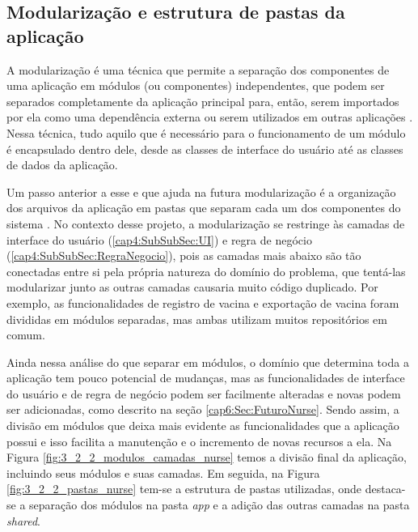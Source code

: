 
\subsection{Modularização e estrutura de pastas da aplicação}
\label{cap4:Subsec:Modularizacao}
A modularização é uma técnica que permite a separação dos componentes de uma aplicação em módulos (ou componentes) independentes, que podem ser separados completamente da aplicação principal para, então, serem importados por ela como uma dependência externa ou serem utilizados em outras aplicações \cite{rifa2020modularization} \cite{Faust2020}. Nessa técnica, tudo aquilo que é necessário para o funcionamento de um módulo é encapsulado dentro dele, desde as classes de interface do usuário até as classes de dados da aplicação.

Um passo anterior a esse e que ajuda na futura modularização é a organização dos arquivos da aplicação em pastas que separam cada um dos componentes do sistema \cite{Faust2020}. No contexto desse projeto, a modularização se restringe às camadas de interface do usuário (\ref{cap4:SubSubSec:UI}) e regra de negócio (\ref{cap4:SubSubSec:RegraNegocio}), pois as camadas mais abaixo são tão conectadas entre si pela própria natureza do domínio do problema, que tentá-las modularizar junto as outras camadas causaria muito código duplicado. Por exemplo, as funcionalidades de registro de vacina e exportação de vacina foram divididas em módulos separadas, mas ambas utilizam muitos repositórios em comum.

Ainda nessa análise do que separar em módulos, o domínio que determina toda a aplicação tem pouco potencial de mudanças, mas as funcionalidades de interface do usuário e de regra de negócio podem ser facilmente alteradas e novas podem ser adicionadas, como descrito na seção \ref{cap6:Sec:FuturoNurse}. Sendo assim, a divisão em módulos que deixa mais evidente as funcionalidades que a aplicação possui e isso facilita a manutenção e o incremento de novas recursos a ela. Na Figura \ref{fig:3_2_2_modulos_camadas_nurse} temos a divisão final da aplicação, incluindo seus módulos e suas camadas. Em seguida, na Figura \ref{fig:3_2_2_pastas_nurse} tem-se a estrutura de pastas utilizadas, onde destaca-se a separação dos módulos na pasta \textit{app} e a adição das outras camadas na pasta \textit{shared}.

